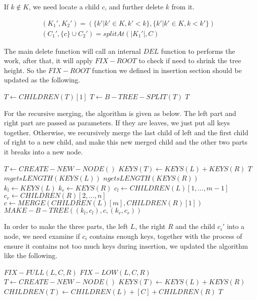 \documentclass{article}
\begin{document}
If $k \notin K$, we need locate a child $c$, and further delete $k$ from
it.

\[
\begin{array}{l}
(K_1', K_2') = (\{k' | k' \in K, k' < k \}, \{k' | k' \in K, k < k' \}) \\
(C_1', \{c\} \cup C_2') = splitAt(|K_1'|, C)
\end{array}
\]

The main delete function will call an internal $DEL$ function to
performs the work, after that, it will apply $FIX-ROOT$ to check
if need to shrink the tree height. So the $FIX-ROOT$ function we
defined in insertion section should be updated as the following.

\begin{algorithmic}[1]
   
    \State $T \gets CHILDREN(T)[1]$
    \State $T \gets B-TREE-SPLIT(T)$
  \EndIf
  \State \Return $T$
\EndFunction
\end{algorithmic}

For the recursive merging, the algorithm is given as below.
The left part and right part are passed as parameters. If
they are leaves, we just put all keys together. Otherwise,
we recursively merge the last child of left and the first child
of right to a new child, and make this new merged child and
the other two parts it breaks into a new node.

\begin{algorithmic}[1]
    \State $T \gets CREATE-NEW-NODE()$
    \State $KEYS(T) \gets KEYS(L)+KEYS(R)$
    \State \Return $T$
  \Else
    \State $m gets LENGTH(KEYS(L))$
    \State $n gets LENGTH(KEYS(R))$
    \State $k_l \gets KEYS(L)$
    \State $k_r \gets KEYS(R)$
    \State $c_l \gets CHILDREN(L)[1, ..., m-1]$
    \State $c_r \gets CHILDREN(R)[2, ..., n]$
    \State $c \gets MERGE(CHILDREN(L)[m], CHILDREN(R)[1])$
    \State \Return $MAKE-B-TREE((k_l, c_l), c, (k_r, c_r))$
  \EndIf
\EndFunction
\end{algorithmic}

In order to make the three parts, the left $L$, the right $R$ and
the child $c_i'$ into a node, we need examine if $c_i$ contains
enough keys, together with the process of ensure it contains not too
much keys during insertion, we updated the algorithm like the following.

\begin{algorithmic}[1]
    \State \Return $FIX-FULL(L, C, R)$
    \State \Return $FIX-LOW(L, C, R)$
  \Else
    \State $T \leftarrow CREATE-NEW-NODE()$
    \State $KEYS(T) \leftarrow KEYS(L) + KEYS(R)$
    \State $CHILDREN(T) \leftarrow CHILDREN(L)+[C]+CHILDREN(R)$
    \State \Return $T$
  \EndIf
\EndFunction
\end{algorithmic}
\end{document}
